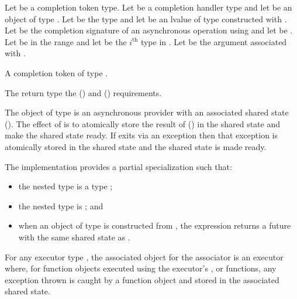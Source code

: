 \begin{itemdescr}
\pnum
Let  be a completion token type. Let  be a completion handler type and let  be an object of type . Let  be the type  and let  be an lvalue of type  constructed with . Let  be the completion signature of an asynchronous operation using  and let  be . Let  be in the range  and let  be the $i^\text{th}$ type in . Let  be the argument associated with .

\pnum
\returns A completion token  of type .

\pnum
\remarks The return type   the  () and  () requirements.

\pnum
The object  of type  is an asynchronous provider with an associated shared state (). The effect of  is to atomically store the result of  () in the shared state and make the shared state ready. If  exits via an exception then that exception is atomically stored in the shared state and the shared state is made ready.

\pnum
The implementation provides a partial specialization  such that:
\begin{itemize}
\item
 the nested type  is a type ;
\item
 the nested type  is ; and
\item
 when an object  of type  is constructed from , the expression  returns a future with the same shared state as .
\end{itemize}

\pnum
For any executor type , the associated object for the associator  is an executor where, for function objects executed using the executor's ,  or  functions, any exception thrown is caught by a function object and stored in the associated shared state.
\end{itemdescr}



